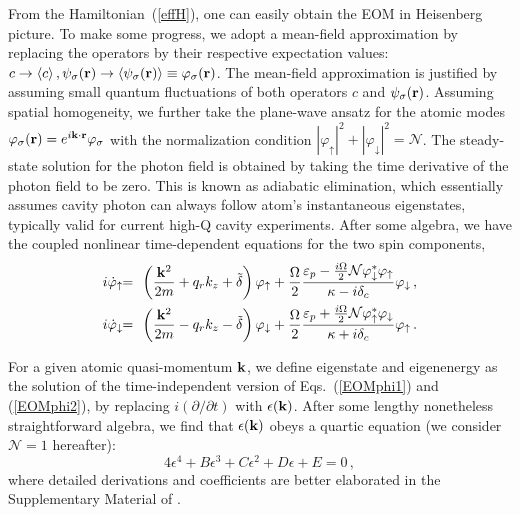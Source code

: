 \documentclass[journal,article,accept,moreauthors,pdftex,12pt,a4paper]{mdpi}
\def\ba{\begin{eqnarray}}
\def\ea{\end{eqnarray}}
\begin{document}
From the Hamiltonian~(\ref{effH}), one can easily obtain the EOM in Heisenberg picture. To make some progress, we adopt a mean-field approximation by replacing the operators by their respective expectation values: $c \rightarrow \langle c \rangle \,, \psi_\sigma ({\bf r}) \rightarrow \langle \psi_\sigma ({\bf r}) \rangle \equiv \varphi_\sigma ({\bf r})$. The mean-field approximation is justified by assuming small quantum fluctuations of both operators $c$ and $\psi_\sigma({\bf r})$. Assuming spatial homogeneity, we further take the plane-wave ansatz for the atomic modes $\varphi_\sigma({\bf r})=e^{i{\bf k}\cdot{\bf r}}\varphi_\sigma$ with the normalization condition $|\varphi_\uparrow|^2+|\varphi_\downarrow|^2=\mathcal{N}$. The steady-state solution for the photon field is obtained by taking the time derivative of the photon field to be zero. This is known as adiabatic elimination, which essentially assumes cavity photon can always follow atom's instantaneous eigenstates, typically valid for current high-Q cavity experiments. After some algebra, we have the coupled nonlinear time-dependent equations for the two spin components, 
\ba
i\dot{\varphi}_{\uparrow}&\!\! =\!\! & \left(\frac{{\bf k}^{2}}{2m}+q_{r}k_{z}+\tilde{\delta}\right) \varphi_{\uparrow}+\frac{\Omega}{2}\frac{\varepsilon_{p}-\frac{i\Omega}{2} \mathcal{N}\varphi_\downarrow^\ast\varphi_\uparrow}{\kappa-i\delta_{c}}\varphi_{\downarrow} \,,\label{EOMphi1}\\
i\dot{\varphi}_{\downarrow} & \!\!= \!\!& \left(\frac{{\bf k}^{2}}{2m}-q_{r}k_{z}-\tilde{\delta}\right)\varphi_{\downarrow}+\frac{\Omega}{2}\frac{\varepsilon_{p}+\frac{i\Omega}{2} \mathcal{N}\varphi_\uparrow^\ast\varphi_\downarrow}{\kappa+i\delta_{c}}\varphi_{\uparrow}\,.\label{EOMphi2}
\ea

For a given atomic quasi-momentum ${\bf k}$, we define eigenstate and eigenenergy as the solution of the time-independent version of Eqs.~(\ref{EOMphi1}) and (\ref{EOMphi2}),  by replacing $i(\partial/\partial t)$ with $\epsilon({\bf k})$. After some lengthy nonetheless straightforward algebra, we find that $\epsilon({\bf k})$ obeys a quartic equation (we consider $\mathcal{N}=1$ hereafter): 
\begin{equation}
4\epsilon^4+B\epsilon^3+C\epsilon^2+D\epsilon+E=0 \,,
\label{generalquarticEq}
\end{equation}
where detailed derivations and coefficients are better elaborated in the Supplementary Material of \cite{cavitySOC}. 
\end{document}
